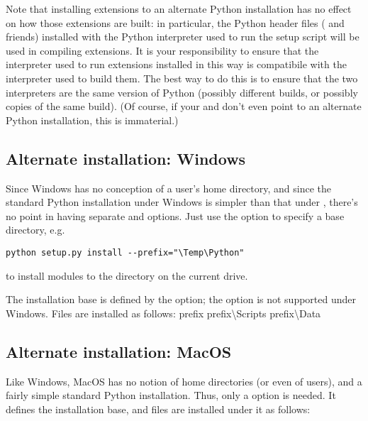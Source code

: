 \documentclass{howto}
\begin{document}
Note that installing extensions to an alternate Python installation has
no effect on how those extensions are built: in particular, the Python
header files ( and friends) installed with the Python
interpreter used to run the setup script will be used in compiling
extensions.  It is your responsibility to ensure that the interpreter
used to run extensions installed in this way is compatibile with the
interpreter used to build them.  The best way to do this is to ensure
that the two interpreters are the same version of Python (possibly
different builds, or possibly copies of the same build).  (Of course, if
your  and  don't even
point to an alternate Python installation, this is immaterial.)


\subsection{Alternate installation: Windows}
\label{alt-install-windows}

Since Windows has no conception of a user's home directory, and since
the standard Python installation under Windows is simpler than that
under \UNIX, there's no point in having separate 
and  options.  Just use the 
option to specify a base directory, e.g.

\begin{verbatim}
python setup.py install --prefix="\Temp\Python"
\end{verbatim}

to install modules to the  directory on the current
drive.

The installation base is defined by the  option;
the  option is not supported under Windows.
Files are installed as follows:
              {prefix}{}
              {prefix}{\textbackslash{}Scripts}
              {prefix}{\textbackslash{}Data}


\subsection{Alternate installation: MacOS}
\label{alt-install-macos}

Like Windows, MacOS has no notion of home directories (or even of
users), and a fairly simple standard Python installation.  Thus, only a
 option is needed.  It defines the installation
base, and files are installed under it as follows:
\end{document}
